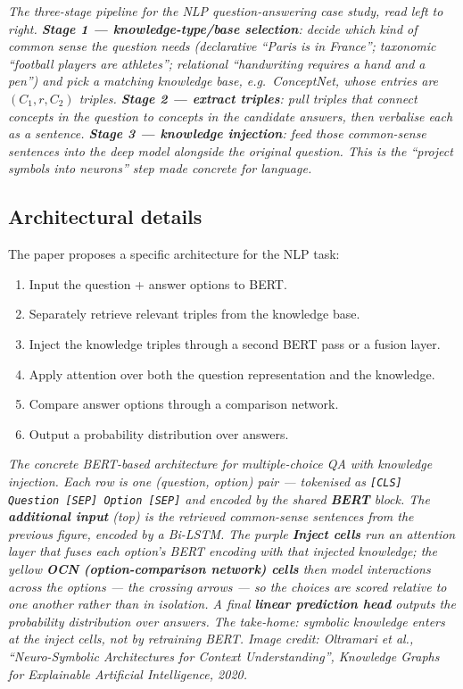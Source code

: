 \documentclass[11pt, a4paper]{article}
\begin{document}
\begin{center}

\footnotesize\textit{The three-stage pipeline for the NLP question-answering case study, read left to right. \textbf{Stage 1 --- knowledge-type/base selection}: decide which kind of common sense the question needs (declarative ``Paris is in France''; taxonomic ``football players are athletes''; relational ``handwriting requires a hand and a pen'') and pick a matching knowledge base, e.g.\ ConceptNet, whose entries are $(C_1, r, C_2)$ triples. \textbf{Stage 2 --- extract triples}: pull triples that connect concepts in the question to concepts in the candidate answers, then verbalise each as a sentence. \textbf{Stage 3 --- knowledge injection}: feed those common-sense sentences into the deep model alongside the original question. This is the ``project symbols into neurons'' step made concrete for language.}
\end{center}

\subsection{Architectural details}

The paper proposes a specific architecture for the NLP task:
\begin{enumerate}
  \item Input the question + answer options to BERT.
  \item Separately retrieve relevant triples from the knowledge base.
  \item Inject the knowledge triples through a second BERT pass or a fusion layer.
  \item Apply attention over both the question representation and the knowledge.
  \item Compare answer options through a comparison network.
  \item Output a probability distribution over answers.
\end{enumerate}

\begin{center}

\footnotesize\textit{The concrete BERT-based architecture for multiple-choice QA with knowledge injection. Each row is one (question, option) pair --- tokenised as \texttt{[CLS] Question [SEP] Option [SEP]} and encoded by the shared \textbf{BERT} block. The \textbf{additional input} (top) is the retrieved common-sense sentences from the previous figure, encoded by a Bi-LSTM. The purple \textbf{Inject cells} run an attention layer that fuses each option's BERT encoding with that injected knowledge; the yellow \textbf{OCN (option-comparison network) cells} then model interactions \emph{across} the options --- the crossing arrows --- so the choices are scored relative to one another rather than in isolation. A final \textbf{linear prediction head} outputs the probability distribution over answers. The take-home: symbolic knowledge enters at the inject cells, not by retraining BERT. Image credit: Oltramari et al., ``Neuro-Symbolic Architectures for Context Understanding'', Knowledge Graphs for Explainable Artificial Intelligence, 2020.}
\end{center}
\end{document}
